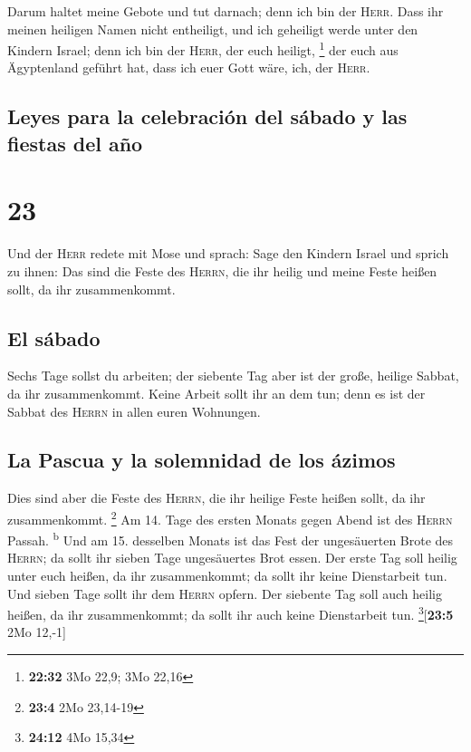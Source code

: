  Darum haltet meine Gebote und tut darnach; denn ich bin
der \textsc{Herr}.  Dass ihr meinen heiligen Namen nicht
entheiligt, und ich geheiligt werde unter den Kindern Israel; denn ich
bin der \textsc{Herr}, der euch heiligt, \footnote{\textbf{22:32} 3Mo
  22,9; 3Mo 22,16}  der euch aus Ägyptenland geführt hat,
dass ich euer Gott wäre, ich, der \textsc{Herr}.

\hypertarget{leyes-para-la-celebraciuxf3n-del-suxe1bado-y-las-fiestas-del-auxf1o}{%
\subsection{Leyes para la celebración del sábado y las fiestas del
año}\label{leyes-para-la-celebraciuxf3n-del-suxe1bado-y-las-fiestas-del-auxf1o}}

\hypertarget{section-22}{%
\section{23}\label{section-22}}

 Und der \textsc{Herr} redete mit Mose und sprach:
 Sage den Kindern Israel und sprich zu ihnen: Das sind die
Feste des \textsc{Herrn}, die ihr heilig und meine Feste heißen sollt,
da ihr zusammenkommt.

\hypertarget{el-suxe1bado}{%
\subsection{El sábado}\label{el-suxe1bado}}

 Sechs Tage sollst du arbeiten; der siebente Tag aber ist
der große, heilige Sabbat, da ihr zusammenkommt. Keine Arbeit sollt ihr
an dem tun; denn es ist der Sabbat des \textsc{Herrn} in allen euren
Wohnungen.

\hypertarget{la-pascua-y-la-solemnidad-de-los-uxe1zimos}{%
\subsection{La Pascua y la solemnidad de los
ázimos}\label{la-pascua-y-la-solemnidad-de-los-uxe1zimos}}

 Dies sind aber die Feste des \textsc{Herrn}, die ihr
heilige Feste heißen sollt, da ihr zusammenkommt. \footnote{\textbf{23:4}
  2Mo 23,14-19}  Am 14. Tage des ersten Monats gegen Abend
ist des \textsc{Herrn} Passah. \textsuperscript{b}  Und am
15. desselben Monats ist das Fest der ungesäuerten Brote des
\textsc{Herrn}; da sollt ihr sieben Tage ungesäuertes Brot essen.
 Der erste Tag soll heilig unter euch heißen, da ihr
zusammenkommt; da sollt ihr keine Dienstarbeit tun.  Und
sieben Tage sollt ihr dem \textsc{Herrn} opfern. Der siebente Tag soll
auch heilig heißen, da ihr zusammenkommt; da sollt ihr auch keine
Dienstarbeit tun. \footnote{\textbf{24:12} 4Mo 15,34}{[}\textbf{23:5}
2Mo 12,-1{]}

